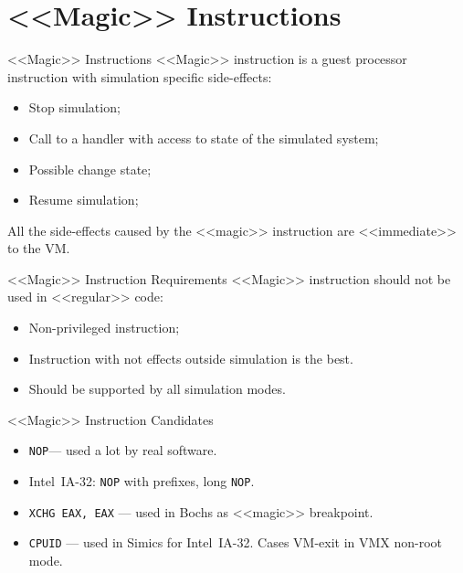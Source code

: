 

\section{<<Magic>> Instructions}

\begin{frame}{<<Magic>> Instructions}
  <<Magic>> instruction is a guest processor instruction with simulation
  specific side-effects:
  \begin{itemize}
    \item Stop simulation;
    \item Call to a handler with access to state of the simulated system;
    \item Possible change state;
    \item Resume simulation;
  \end{itemize}
  \vfill
  All the side-effects caused by the <<magic>> instruction are <<immediate>>
  to the VM.
\end{frame}

\begin{frame}{<<Magic>> Instruction Requirements}
  <<Magic>> instruction should not be used in <<regular>> code:
  \begin{itemize}
    \item Non-privileged instruction;
    \item Instruction with not effects outside simulation is the best.
    \item Should be supported by all simulation modes.
  \end{itemize}
\end{frame}

\begin{frame}{<<Magic>> Instruction Candidates}
  \begin{itemize}
    \item \texttt{NOP}\pause --- used a lot by real software.
    \item Intel\reg~IA-32: \texttt{NOP} with prefixes, long \texttt{NOP}.
    \item \texttt{XCHG EAX, EAX} --- used in Bochs as <<magic>> breakpoint.
    \item \texttt{CPUID} --- used in Simics for Intel\reg~IA-32. Cases VM-exit
      in VMX non-root mode.
  \end{itemize}
\end{frame}

